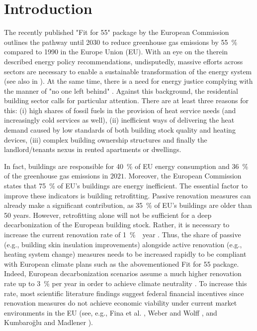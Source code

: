 \section{Introduction}
The recently published "Fit for 55" package \cite{european_commission_european_2019} by the European Commission outlines the pathway until 2030 to reduce greenhouse gas emissions by \SI{55}{\%} compared to 1990 in the Europe Union (EU). With an eye on the therein described energy policy recommendations, undisputedly, massive efforts across sectors are necessary to enable a sustainable transformation of the energy system (see also in \cite{korkmaz2020comparison}). At the same time, there is a need for energy justice complying with the manner of "no one left behind" \cite{sovacool2019decarbonization}. Against this background, the residential building sector calls for particular attention. There are at least three reasons for this: (i) high shares of fossil fuels in the provision of heat service needs (and increasingly cold services as well), (ii) inefficient ways of delivering the heat demand caused by low standards of both building stock quality and heating devices, (iii) complex building ownership structures and finally the landlord/tenants nexus in rented apartments or dwellings.\vspace{0.5cm}

In fact, buildings are responsible for \SI{40}{\%} of EU energy consumption and \SI{36}{\%} of the greenhouse gas emissions in $2021$. Moreover, the European Commission states that \SI{75}{\%} of EU's buildings are energy inefficient. The essential factor to improve these indicators is building retrofitting. Passive renovation measures can already make a significant contribution, as \SI{35}{\%} of EU's buildings are older than \SI{50}{} years. However, retrofitting alone will not be sufficient for a deep decarbonization of the European building stock. Rather, it is necessary to increase the current renovation rate of \SI{1}{\% \per year} \cite{eurocombuildings2021}. Thus, the share of passive (e.g., building skin insulation improvements) alongside active renovation (e.g., heating system change) measures needs to be increased rapidly to be compliant with European climate plans such as the abovementioned Fit for 55 package. Indeed, European decarbonization scenarios assume a much higher renovation rate up to \SI{3}{\%} per year in order to achieve climate neutrality \cite{korkmaz2020comparison}. To increase this rate, most scientific literature findings suggest federal financial incentives since renovation measures do not achieve economic viability under current market environments in the EU (see, e.g., Fina et al. \cite{fina2019profitability}, Weber and Wolff \cite{weber2018energy}, and Kumbaroğlu and Madlener \cite{kumbarouglu2012evaluation}).\vspace{0.5cm}

